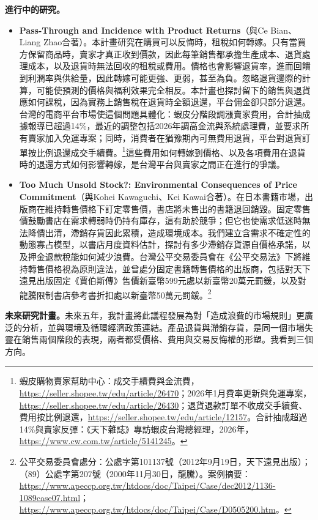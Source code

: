 \documentclass[11pt,letterpaper]{article}
\begin{document}
\medskip
\noindent\textbf{進行中的研究。}
\begin{itemize}[leftmargin=1.6em,itemsep=0.2em,topsep=0.1em,parsep=0.1em]
\item \textbf{Pass-Through and Incidence with Product Returns}（與Ce Bian、Liang Zhao合著）。本計畫研究在購買可以反悔時，租稅如何轉嫁。只有當買方保留商品時，賣家才真正收到價款，因此每筆銷售都承擔生產成本、退貨處理成本，以及退貨時無法回收的租稅或費用。價格也會影響退貨率，進而回饋到利潤率與供給量，因此轉嫁可能更強、更弱，甚至為負。忽略退貨邊際的計算，可能使預測的價格與福利效果完全相反。本計畫也探討留下的銷售與退貨應如何課稅，因為實務上銷售稅在退貨時全額退還，平台佣金卻只部分退還。台灣的電商平台市場使這個問題具體化：蝦皮分階段調漲賣家費用，合計抽成據報導已超過14\%，最近的調整包括2026年調高金流與系統處理費，並要求所有賣家加入免運專案；同時，消費者在猶豫期內可無費用退貨，平台對退貨訂單按比例退還成交手續費。\footnote{蝦皮購物賣家幫助中心：成交手續費與金流費，\url{https://seller.shopee.tw/edu/article/26470}；2026年1月費率更新與免運專案，\url{https://seller.shopee.tw/edu/article/26430}；退貨退款訂單不收成交手續費、費用按比例退還，\url{https://seller.shopee.tw/edu/article/12157}。合計抽成超過14\%與賣家反彈：《天下雜誌》專訪蝦皮台灣總經理，2026年，\url{https://www.cw.com.tw/article/5141245}。}這些費用如何轉嫁到價格、以及各項費用在退貨時的退還方式如何影響轉嫁，是台灣平台與賣家之間正在進行的爭議。
\item \textbf{Too Much Unsold Stock?: Environmental Consequences of Price Commitment}（與Kohei Kawaguchi、Kei Kawai合著）。在日本書籍市場，出版商在維持轉售價格下訂定零售價，書店將未售出的書籍退回銷毀。固定零售價鼓勵書店在需求轉弱時仍持有庫存，這有助於競爭；但它也使需求低迷時無法降價出清，滯銷存貨因此累積，造成環境成本。我們建立含需求不確定性的動態寡占模型，以書店月度資料估計，探討有多少滯銷存貨源自價格承諾，以及押金退款稅能如何減少浪費。台灣公平交易委員會在《公平交易法》下將維持轉售價格視為原則違法，並曾處分固定書籍轉售價格的出版商，包括對天下遠見出版固定《賈伯斯傳》售價新臺幣599元處以新臺幣20萬元罰鍰，以及對龍騰限制書店參考書折扣處以新臺幣50萬元罰鍰。\footnote{公平交易委員會處分：公處字第101137號（2012年9月19日，天下遠見出版）；（89）公處字第207號（2000年11月30日，龍騰）。案例摘要：\url{https://www.apeccp.org.tw/htdocs/doc/Taipei/Case/dec2012/1136-1089case07.html}；\url{https://www.apeccp.org.tw/htdocs/doc/Taipei/Case/D0505200.htm}。}
\end{itemize}

\medskip
\noindent\textbf{未來研究計畫。}未來五年，我計畫將此議程發展為對「造成浪費的市場規則」更廣泛的分析，並與環境及循環經濟政策連結。產品退貨與滯銷存貨，是同一個市場失靈在銷售兩個階段的表現，兩者都受價格、費用與交易反悔權的形塑。我看到三個方向。
\end{document}
